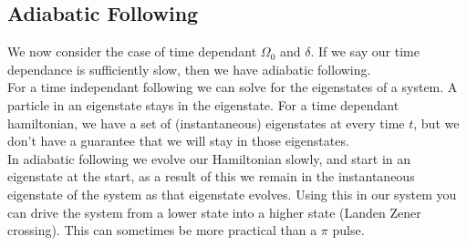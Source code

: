 \subsection{Adiabatic Following}
We now consider the case of time dependant $\Omega_0$ and $\delta$. If we say our time dependance is sufficiently slow, then we have adiabatic following. \\
For a time independant following we can solve for the eigenstates of a system. A particle in an eigenstate stays in the eigenstate. For a time dependant hamiltonian, we have a set of (instantaneous) eigenstates at every time $t$, but we don't have a guarantee that we will stay in those eigenstates. \\
In adiabatic following we evolve our Hamiltonian slowly, and start in an eigenstate at the start, as a result of this we remain in the instantaneous eigenstate of the system as that eigenstate evolves. Using this in our system you can drive the system from a lower state into a higher state (Landen Zener crossing). This can sometimes be more practical than a $\pi$ pulse.

